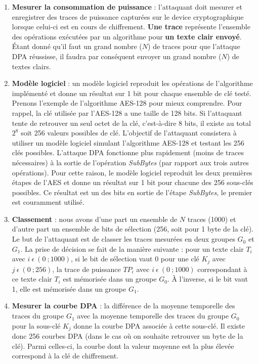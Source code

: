 \documentclass[oneside]{book}
\begin{document}
\begin{enumerate}
\item \textbf{Mesurer la consommation de puissance} : l'attaquant doit mesurer et enregistrer des traces de puissance capturées sur le device cryptographique lorsque celui-ci est en cours de chiffrement. \textbf{Une trace} représente l'ensemble des opérations exécutées par un algorithme pour \textbf{un texte clair envoyé}. Étant donné qu'il faut un grand nombre ($N$) de traces pour que l'attaque DPA réussisse, il faudra par conséquent envoyer un grand nombre ($N$) de textes clairs.
\item \textbf{Modèle logiciel} : un modèle logiciel reproduit les opérations de l’algorithme implémenté et donne un résultat sur 1 bit pour chaque ensemble de clé testé. Prenons l'exemple de l'algorithme AES-128 pour mieux comprendre. Pour rappel, la clé utilisée par l'AES-128 a une taille de 128 bits. Si l'attaquant tente de retrouver un seul octet de la clé, c'est-à-dire 8 bits, il existe au total $2^{8}$ soit 256 valeurs possibles de clé. L'objectif de l'attaquant consistera à utiliser un modèle logiciel simulant l'algorithme AES-128 et testant les 256 clés possibles. L'attaque DPA fonctionne plus rapidement (moins de traces nécessaires) à la sortie de l'opération \textit{SubBytes} (par rapport aux trois autres opérations). Pour cette raison, le modèle logiciel reproduit les deux premières étapes de l’AES et donne un résultat sur 1 bit pour chacune des 256 sous-clés possibles. Ce résultat est un des bits en sortie de l’étape \textit{SubBytes}, le premier est couramment utilisé.
\item \textbf{Classement} : nous avons d'une part un ensemble de $N$ traces (1000) et d'autre part un ensemble de bits de sélection (256, soit pour 1 byte de la clé). Le but de l'attaquant est de classer les traces mesurées en deux groupes $G_0$ et $G_1$. La prise de décision se fait de la manière suivante : pour un texte clair $T_i$ avec $i \ \epsilon \ (0 \ ;1000)$, si le bit de sélection vaut 0 pour une clé $K_j$ avec $j \ \epsilon \ (0 \ ; 256)$, la trace de puissance $TP_i$ avec $i \ \epsilon \ (0 \ ; 1000)$ correspondant à ce texte clair $T_i$ est mémorisée dans un groupe $G_0$. À l'inverse, si le bit vaut 1, elle est mémorisée dans un groupe $G_1$.
\item \textbf{Mesurer la courbe DPA} : la différence de la moyenne temporelle des traces du groupe $G_1$ avec la moyenne temporelle des traces du groupe $G_0$ pour la sous-clé $K_j$ donne la courbe DPA associée à cette sous-clé. Il existe donc 256 courbes DPA (dans le cas où on souhaite retrouver un byte de la clé). Parmi celles-ci, la courbe dont la valeur moyenne est la plus élevée correspond à la clé de chiffrement.
\end{enumerate}
\end{document}
